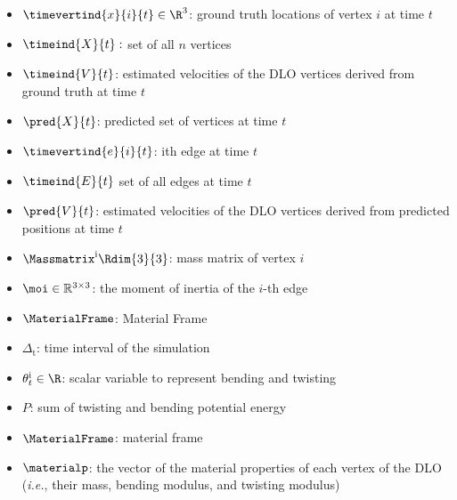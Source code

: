 \begin{itemize}
    \item $\timevertind{x}{i}{t} \in \R^3$: ground truth locations of vertex $i$ at time $t$
    \item $\timeind{X}{t}:$ set of all $n$ vertices
    \item $\timeind{V}{t}$: estimated velocities of the DLO vertices derived from ground truth at time $t$
    \item $\pred{X}{t}$: predicted set of vertices at time $t$
    \item $\timevertind{e}{i}{t}$: ith edge at time $t$
    \item $\timeind{E}{t}$  set of all edges at time $t$
    \item $\pred{V}{t}$: estimated velocities of the DLO vertices derived from predicted positions at time $t$
    \item $\Massmatrix^\text{i} \Rdim{3}{3}$: mass matrix of vertex $i$
    \item $\moi\in \mathbb{R}^{3\times3}$: the moment of inertia of the 
    $i$-th edge
    \item $\MaterialFrame$: Material Frame
    \item $\Delta_\text{t}$: time interval of the simulation
    \item $\theta^\text{i}_{t} \in \R$: scalar variable to represent bending and twisting
    \item $P$: sum of twisting and bending potential energy
    \item $\MaterialFrame$: material frame
    \item $\materialp$: the vector of the material properties of each vertex of the DLO (\textit{i.e.}, their mass, bending modulus, and twisting modulus)
\end{itemize}

